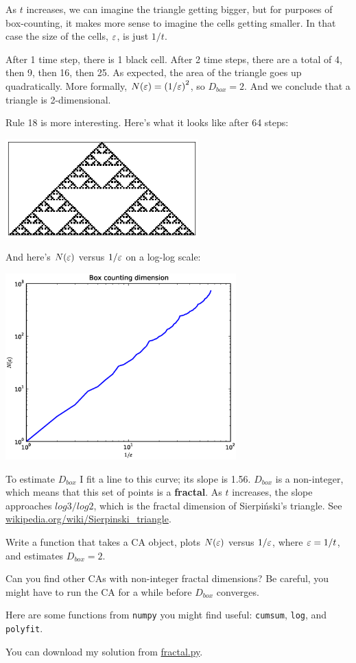\documentclass[10pt]{book}
\begin{document}
As $t$ increases, we can imagine the triangle getting bigger, 
but for purposes of box-counting, it makes more sense to imagine
the cells getting smaller.  In that case the size of the cells,
$\varepsilon$, is just $1/t$.

After 1 time step, there is 1 black cell.  After 2 time steps, there
are a total of 4, then 9, then 16, then 25.  As expected, the area
of the triangle goes up quadratically.  More formally,
$N(\varepsilon) = \left( 1 / \varepsilon \right)^2$, so $D_{box} = 2$.  And we conclude
that a triangle is 2-dimensional.

Rule 18 is more interesting.  Here's what it looks like after 64 steps:

\beforefig
\centerline{\includegraphics[height=1.5in]{figs/rule18.eps}}
\afterfig

And here's $N(\varepsilon)$ versus $1/\varepsilon$ on a log-log scale:

\beforefig
\centerline{\includegraphics[width=3.5in]{figs/fractal_dim18.64.eps}}
\afterfig

To estimate $D_{box}$ I fit a line to this curve; its slope is 1.56.
$D_{box}$ is a non-integer, which means that this set of
points is a {\bf fractal}.  As $t$ increases, the slope approaches
$log 3 / log 2$, which is the fractal dimension of Sierpi\'{n}ski's
triangle.  See \url{wikipedia.org/wiki/Sierpinski_triangle}.

\begin{ex}

Write a function that takes a CA object, plots $N(\varepsilon)$ versus
$1/\varepsilon$, where $\varepsilon = 1/t$, and estimates $D_{box} = 2$.

Can you find other CAs with non-integer fractal dimensions?  Be
careful, you might have to run the CA for a while before
$D_{box}$ converges.

Here are some functions from {\tt numpy} you might find useful:
{\tt cumsum}, {\tt log}, and {\tt polyfit}.

You can download my solution from \url{fractal.py}.

\end{ex}
\end{document}
